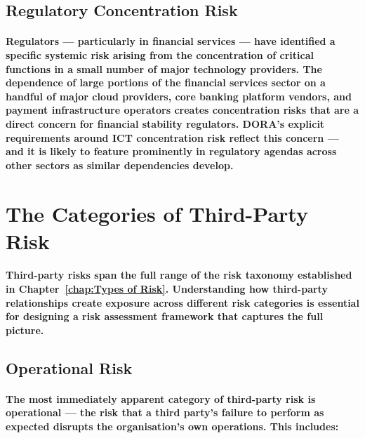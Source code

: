\subsection{Regulatory Concentration Risk}
\paragraph{Regulators — particularly in financial services — have identified a specific systemic risk arising from the concentration of critical functions in a small number of major technology providers. The dependence of large portions of the financial services sector on a handful of major cloud providers, core banking platform vendors, and payment infrastructure operators creates concentration risks that are a direct concern for financial stability regulators. DORA's explicit requirements around ICT concentration risk reflect this concern — and it is likely to feature prominently in regulatory agendas across other sectors as similar dependencies develop.}

\section{The Categories of Third-Party Risk}
\paragraph{Third-party risks span the full range of the risk taxonomy established in Chapter~\ref{chap:Types of Risk}. Understanding how third-party relationships create exposure across different risk categories is essential for designing a risk assessment framework that captures the full picture.}

\subsection{Operational Risk}
\paragraph{The most immediately apparent category of third-party risk is \textbf{operational} — the risk that a third party's failure to perform as expected disrupts the organisation's own operations. This includes:}
\begin{itemize}
\end{itemize}
